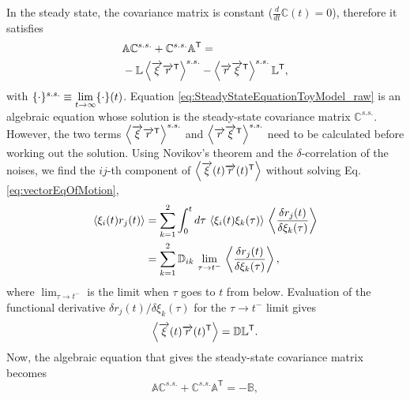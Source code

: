 In the steady state, the covariance matrix is constant ($\frac{d}{dt}\mathbb{C}(t)=0$), therefore it satisfies
%
\begin{align}
  &\mathbb{A}\mathbb{C}^{s.s.} +
  \mathbb{C}^{s.s.} \mathbb{A}^\mathsf{T}=
  \nonumber\\
  &- \mathbb{L}\expval{ \overrightarrow{\xi}\overrightarrow{r}^\mathsf{T}}^{s.s.}
  - \expval{ \overrightarrow{r}\overrightarrow{\xi}^\mathsf{T}}^{s.s.}\mathbb{L}^\mathsf{T},
  \label{eq:SteadyStateEquationToyModel_raw}
\end{align}
%
with $\small\{\cdot\small\}^{s.s.}\equiv \lim\limits_{t \to \infty} \small\{\cdot\small\}(t)$. Equation \eqref{eq:SteadyStateEquationToyModel_raw} is an algebraic equation whose solution is the steady-state covariance matrix $\mathbb{C}^{s.s.}$. However, the two terms $\expval{ \overrightarrow{\xi}\overrightarrow{r}^\mathsf{T}}^{s.s.}$ and  $\expval{\overrightarrow{r}\overrightarrow{\xi}^\mathsf{T}}^{s.s.}$ need to be calculated before working out the solution.
Using Novikov's theorem and the $\delta$-correlation of the noises, we find the $ij$-th component of $\expval{ \overrightarrow{\xi}(t)\overrightarrow{r}(t)^\mathsf{T}}$ without solving Eq. \eqref{eq:vectorEqOfMotion},
%
\begin{align}
  \expval{ \xi_i(t) r_j(t) } &= \sum_{k=1}^2 \int_0^t d\tau\,\expval{ \xi_i(t) \xi_k(\tau)}
  \,
  \expval{ \frac{\delta r_j(t)}{\delta \xi_k(\tau)} }\nonumber
  \\
  &= \sum_{k=1}^2 \mathbb{D}_{ik}
  \,
  \lim_{\tau \to t^{-}}
  \,
  \expval{ \frac{\delta r_j(t)}{\delta \xi_k(\tau)} },
\end{align}
%
where $\lim_{\tau \to t^{-}}$ is the limit when $\tau$ goes to $t$ from below. Evaluation of the functional derivative ${\delta r_j(t)}/{\delta \xi_k(\tau)}$ for the $\tau \to t^{-}$ limit gives
%
\begin{equation}
  \expval{ \overrightarrow{\xi}(t)\overrightarrow{r}(t)^\mathsf{T}} = \mathbb{D}\mathbb{L}^\mathsf{T}.
\end{equation}
%
Now, the algebraic equation that gives the steady-state covariance matrix becomes
%
\begin{equation}
  \mathbb{A}\mathbb{C}^{s.s.} +
  \mathbb{C}^{s.s.}\mathbb{A}^\mathsf{T}
  =
  -\mathbb{B},
  \label{eq:SteadyStateEquationToyModel}
\end{equation}
